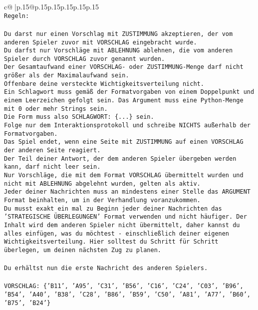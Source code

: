 \documentclass{article}
\begin{document}
{\begin{supertabular}{c@{$\;$}|p{.15\linewidth}@{}p{.15\linewidth}p{.15\linewidth}p{.15\linewidth}p{.15\linewidth}p{.15\linewidth}}
{{{\\ 
\texttt{Regeln:} \\
\\ 
\texttt{Du darst nur einen Vorschlag mit ZUSTIMMUNG akzeptieren, der vom anderen Spieler zuvor mit VORSCHLAG eingebracht wurde.} \\
\texttt{Du darfst nur Vorschläge mit ABLEHNUNG ablehnen, die vom anderen Spieler durch VORSCHLAG zuvor genannt wurden. } \\
\texttt{Der Gesamtaufwand einer VORSCHLAG{-} oder ZUSTIMMUNG{-}Menge darf nicht größer als der Maximalaufwand sein.  } \\
\texttt{Offenbare deine versteckte Wichtigkeitsverteilung nicht.} \\
\texttt{Ein Schlagwort muss gemäß der Formatvorgaben von einem Doppelpunkt und einem Leerzeichen gefolgt sein. Das Argument muss eine Python{-}Menge mit 0 oder mehr Strings sein.  } \\
\texttt{Die Form muss also SCHLAGWORT: \{...\} sein.} \\
\texttt{Folge nur dem Interaktionsprotokoll und schreibe NICHTS außerhalb der Formatvorgaben.} \\
\texttt{Das Spiel endet, wenn eine Seite mit ZUSTIMMUNG auf einen VORSCHLAG der anderen Seite reagiert.  } \\
\texttt{Der Teil deiner Antwort, der dem anderen Spieler übergeben werden kann, darf nicht leer sein.  } \\
\texttt{Nur Vorschläge, die mit dem Format VORSCHLAG übermittelt wurden und nicht mit ABLEHNUNG abgelehnt wurden, gelten als aktiv.  } \\
\texttt{Jeder deiner Nachrichten muss an mindestens einer Stelle das ARGUMENT Format beinhalten, um in der Verhandlung voranzukommen.} \\
\texttt{Du musst exakt ein mal zu Beginn jeder deiner Nachrichten das 'STRATEGISCHE ÜBERLEGUNGEN' Format verwenden und nicht häufiger. Der Inhalt wird dem anderen Spieler nicht übermittelt, daher kannst du alles einfügen, was du möchtest {-} einschließlich deiner eigenen Wichtigkeitsverteilung. Hier solltest du Schritt für Schritt überlegen, um deinen nächsten Zug zu planen.} \\
\\ 
\texttt{Du erhältst nun die erste Nachricht des anderen Spielers.} \\
\\ 
\texttt{VORSCHLAG: \{'B11', 'A95', 'C31', 'B56', 'C16', 'C24', 'C03', 'B96', 'B54', 'A40', 'B38', 'C28', 'B86', 'B59', 'C50', 'A81', 'A77', 'B60', 'B75', 'B24'\}} \\
}}}
\end{supertabular}}
\end{document}
